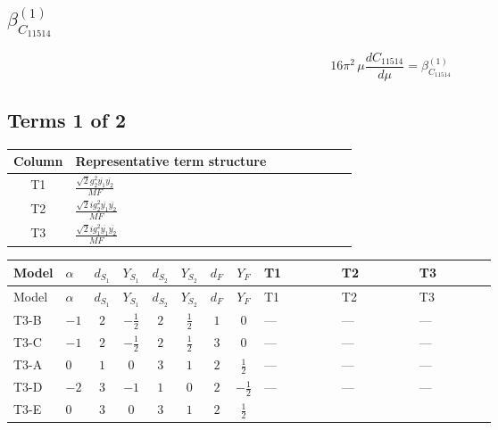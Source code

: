 \documentclass[8pt]{article}
\begin{document}
\begin{landscape}
\section*{$\beta_{C_{11514}}^{(1)}$}
\[16\pi^2\,\mu\frac{d C_{11514}}{d\mu}=\beta_{C_{11514}}^{(1)}\]
\subsection*{Terms 1 of 2}
\begin{center}
\begin{tabular}{@{}c >{\raggedright\arraybackslash}p{0.82\linewidth}@{}}
\toprule
Column & Representative term structure \\
\midrule
T1 & \(\displaystyle \frac{\sqrt{2} g_{2}^{2} \overline{y_{1}} \overline{y_{2}}}{MF}\) \\
\midrule
T2 & \(\displaystyle \frac{\sqrt{2} i g_{2}^{2} \overline{y_{1}} \overline{y_{2}}}{MF}\) \\
\midrule
T3 & \(\displaystyle \frac{\sqrt{2} i g_{1}^{2} \overline{y_{1}} \overline{y_{2}}}{MF}\) \\
\midrule
\bottomrule
\end{tabular}
\end{center}
\smallskip
\tiny
\begin{longtable}{@{}llcccccc >{\raggedright\arraybackslash}p{0.21\linewidth} >{\raggedright\arraybackslash}p{0.21\linewidth} >{\raggedright\arraybackslash}p{0.21\linewidth}@{}}
\toprule
Model & $\alpha$ & $d_{S_1}$ & $Y_{S_1}$ & $d_{S_2}$ & $Y_{S_2}$ & $d_F$ & $Y_F$ & T1 & T2 & T3 \\
\midrule
\endfirsthead
\toprule
Model & $\alpha$ & $d_{S_1}$ & $Y_{S_1}$ & $d_{S_2}$ & $Y_{S_2}$ & $d_F$ & $Y_F$ & T1 & T2 & T3 \\
\midrule
\endhead
T3-B & $-1$ & $2$ & $-\frac{1}{2}$ & $2$ & $\frac{1}{2}$ & $1$ & $0$ & --- & --- & --- \\
\midrule
T3-C & $-1$ & $2$ & $-\frac{1}{2}$ & $2$ & $\frac{1}{2}$ & $3$ & $0$ & --- & --- & --- \\
\midrule
T3-A & $0$ & $1$ & $0$ & $3$ & $1$ & $2$ & $\frac{1}{2}$ & --- & --- & --- \\
\midrule
T3-D & $-2$ & $3$ & $-1$ & $1$ & $0$ & $2$ & $-\frac{1}{2}$ & --- & --- & --- \\
\midrule
T3-E & $0$ & $3$ & $0$ & $3$ & $1$ & $2$ & $\frac{1}{2}$ & \scriptsize\adjustbox{max width=\linewidth}{$\begin{gathered} \frac{\sqrt{2} g_{2}^{2} \overline{y_{1}} \overline{y_{2}}}{4 MF}\end{gathered}$} & \scriptsize\adjustbox{max width=\linewidth}{$\begin{gathered} - \frac{33 \sqrt{2} i g_{2}^{2} \overline{y_{1}} \overline{y_{2}}}{16 MF}\end{gathered}$} & \scriptsize\adjustbox{max width=\linewidth}{$\begin{gathered} - \frac{3 \sqrt{2} i g_{1}^{2} \overline{y_{1}} \overline{y_{2}}}{16 MF}\end{gathered}$} \\
\midrule
\bottomrule
\end{longtable}
\clearpage

\end{landscape}
\end{document}
